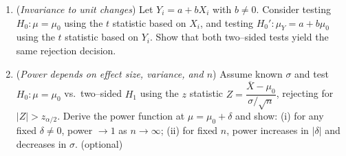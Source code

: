 \documentclass[12pt]{article}
\begin{document}
\begin{enumerate}
\item (\emph{Invariance to unit changes})
Let $Y_i=a+bX_i$ with $b\neq0$. Consider testing $H_0:\mu=\mu_0$ using the $t$ statistic based on ${X_i}$, and testing $H_0':\mu_Y=a+b\mu_0$ using the $t$ statistic based on ${Y_i}$. Show that both two–sided tests yield the same rejection decision.

\clearpage


\item (\emph{Power depends on effect size, variance, and $n$})
Assume known $\sigma$ and test $H_0:\mu=\mu_0$ vs.\ two–sided $H_1$ using the $z$ statistic $Z=\dfrac{\overline{X}-\mu_0}{\sigma/\sqrt{n}}$, rejecting for $|Z|>z_{\alpha/2}$. Derive the power function at $\mu=\mu_0+\delta$ and show: (i) for any fixed $\delta\neq0$, power $\to1$ as $n\to\infty$; (ii) for fixed $n$, power increases in $|\delta|$ and decreases in $\sigma$. (optional)

\end{enumerate}
\end{document}

